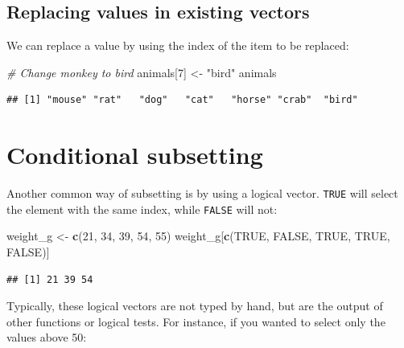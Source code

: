 \documentclass[
]{book}
\newenvironment{Shaded}{\begin{snugshade}}{\end{snugshade}}
\newcommand{\CommentTok}[1]{\textcolor[rgb]{0.56,0.35,0.01}{\textit{#1}}}
\newcommand{\ConstantTok}[1]{\textcolor[rgb]{0.56,0.35,0.01}{#1}}
\newcommand{\DecValTok}[1]{\textcolor[rgb]{0.00,0.00,0.81}{#1}}
\newcommand{\FunctionTok}[1]{\textcolor[rgb]{0.13,0.29,0.53}{\textbf{#1}}}
\newcommand{\NormalTok}[1]{#1}
\newcommand{\OtherTok}[1]{\textcolor[rgb]{0.56,0.35,0.01}{#1}}
\newcommand{\StringTok}[1]{\textcolor[rgb]{0.31,0.60,0.02}{#1}}
\begin{document}
\subsection*{Replacing values in existing vectors}\label{replacing-values-in-existing-vectors}

We can replace a value by using the index of the item to be replaced:

\begin{Shaded}
\begin{Highlighting}[]
\CommentTok{\# Change monkey to bird}
\NormalTok{animals[}\DecValTok{7}\NormalTok{] }\OtherTok{\textless{}{-}} \StringTok{"bird"}
\NormalTok{animals}
\end{Highlighting}
\end{Shaded}

\begin{verbatim}
## [1] "mouse" "rat"   "dog"   "cat"   "horse" "crab"  "bird"
\end{verbatim}

\section{Conditional subsetting}\label{conditional-subsetting}

Another common way of subsetting is by using a logical vector. \texttt{TRUE} will select the element with the same index, while \texttt{FALSE} will not:

\begin{Shaded}
\begin{Highlighting}[]
\NormalTok{weight\_g }\OtherTok{\textless{}{-}} \FunctionTok{c}\NormalTok{(}\DecValTok{21}\NormalTok{, }\DecValTok{34}\NormalTok{, }\DecValTok{39}\NormalTok{, }\DecValTok{54}\NormalTok{, }\DecValTok{55}\NormalTok{)}
\NormalTok{weight\_g[}\FunctionTok{c}\NormalTok{(}\ConstantTok{TRUE}\NormalTok{, }\ConstantTok{FALSE}\NormalTok{, }\ConstantTok{TRUE}\NormalTok{, }\ConstantTok{TRUE}\NormalTok{, }\ConstantTok{FALSE}\NormalTok{)]}
\end{Highlighting}
\end{Shaded}

\begin{verbatim}
## [1] 21 39 54
\end{verbatim}

Typically, these logical vectors are not typed by hand, but are the output of other functions or logical tests. For instance, if you wanted to select only the values above 50:
\end{document}
